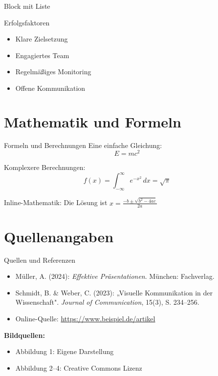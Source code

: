 \documentclass[aspectratio=169,10pt]{beamer}
\begin{document}
\begin{frame}{Block mit Liste}
\begin{block}{Erfolgsfaktoren}
  \begin{itemize}
    \item Klare Zielsetzung
    \item Engagiertes Team
    \item Regelmäßiges Monitoring
    \item Offene Kommunikation
  \end{itemize}
\end{block}
\end{frame}

\section{Mathematik und Formeln}
\begin{frame}{Formeln und Berechnungen}
Eine einfache Gleichung:
\[
E = mc^2
\]

\vspace{0.5cm}
Komplexere Berechnungen:
\[
f(x) = \int_{-\infty}^{\infty} e^{-x^2} \, dx = \sqrt{\pi}
\]

\vspace{0.3cm}
Inline-Mathematik: Die Lösung ist $x = \frac{-b \pm \sqrt{b^2-4ac}}{2a}$
\end{frame}

\section{Quellenangaben}
\begin{frame}{Quellen und Referenzen}
\small
\begin{itemize}
  \item Müller, A. (2024): \textit{Effektive Präsentationen}. München: Fachverlag.
  \item Schmidt, B. \& Weber, C. (2023): „Visuelle Kommunikation in der Wissenschaft". \textit{Journal of Communication}, 15(3), S. 234--256.
  \item Online-Quelle: \url{https://www.beispiel.de/artikel}
\end{itemize}

\vspace{0.5cm}
\textbf{Bildquellen:}
\begin{itemize}
  \item Abbildung 1: Eigene Darstellung
  \item Abbildung 2--4: Creative Commons Lizenz
\end{itemize}
\end{frame}
\end{document}
